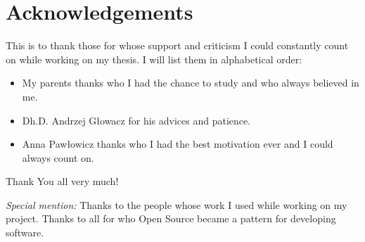 \chapter{Acknowledgements}
This is to thank those for whose support and criticism I could constantly count on
while working on my thesis. I will list them in alphabetical order:

\begin{itemize}
\item My parents thanks who I had the chance to study and who always believed in me.  
\item Dh.D. Andrzej Głowacz for his advices and patience. 
\item Anna Pawłowicz thanks who I had the best motivation ever and I could always count on.
\end{itemize}

Thank You all very much!

\emph{Special mention:} Thanks to the people whose work I used while working on my project.
Thanks to all for who Open Source became a pattern for developing software.
